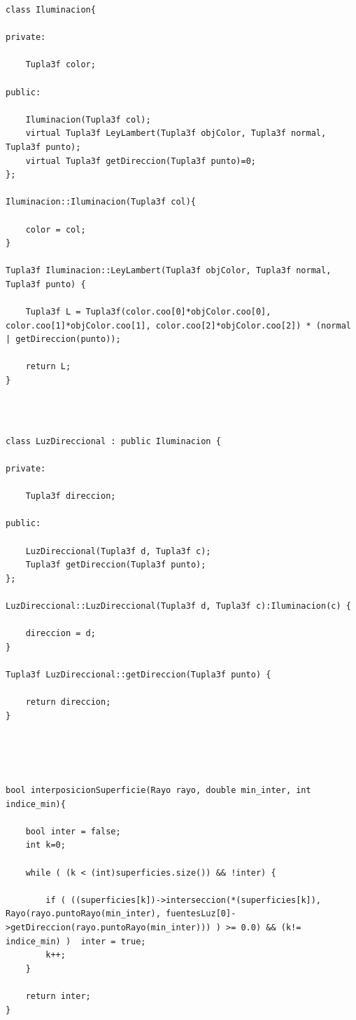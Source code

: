 \begin{lstlisting}[style=Consola]
class Iluminacion{

private:

	Tupla3f color;

public:

	Iluminacion(Tupla3f col);
	virtual Tupla3f LeyLambert(Tupla3f objColor, Tupla3f normal, Tupla3f punto);
	virtual Tupla3f getDireccion(Tupla3f punto)=0;
};

Iluminacion::Iluminacion(Tupla3f col){

	color = col;
}

Tupla3f Iluminacion::LeyLambert(Tupla3f objColor, Tupla3f normal, Tupla3f punto) {

	Tupla3f L = Tupla3f(color.coo[0]*objColor.coo[0], color.coo[1]*objColor.coo[1], color.coo[2]*objColor.coo[2]) * (normal | getDireccion(punto));

	return L;
}
\end{lstlisting}
${ }$\\


\begin{lstlisting}[style=Consola]

class LuzDireccional : public Iluminacion {

private:

	Tupla3f direccion;

public:

	LuzDireccional(Tupla3f d, Tupla3f c);
	Tupla3f getDireccion(Tupla3f punto);
};

LuzDireccional::LuzDireccional(Tupla3f d, Tupla3f c):Iluminacion(c) {

	direccion = d;
}

Tupla3f LuzDireccional::getDireccion(Tupla3f punto) {

	return direccion;
}


\end{lstlisting}
${ }$\\

\begin{lstlisting}[style=Consola]

bool interposicionSuperficie(Rayo rayo, double min_inter, int indice_min){

	bool inter = false;
	int k=0;

	while ( (k < (int)superficies.size()) && !inter) {

		if ( ((superficies[k])->interseccion(*(superficies[k]),  Rayo(rayo.puntoRayo(min_inter), fuentesLuz[0]->getDireccion(rayo.puntoRayo(min_inter))) ) >= 0.0) && (k!= indice_min) )  inter = true;
		k++;
	}
	
	return inter;
}
\end{lstlisting}
	${ }$\\
	
